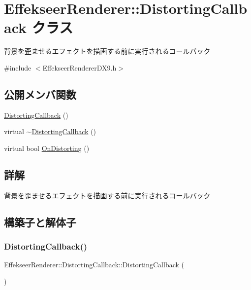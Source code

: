 \hypertarget{class_effekseer_renderer_1_1_distorting_callback}{}\section{Effekseer\+Renderer\+:\+:Distorting\+Callback クラス}
\label{class_effekseer_renderer_1_1_distorting_callback}


背景を歪ませるエフェクトを描画する前に実行されるコールバック  




{\ttfamily \#include $<$Effekseer\+Renderer\+D\+X9.\+h$>$}

\subsection*{公開メンバ関数}
\begin{DoxyCompactItemize}
\item 
\mbox{\hyperlink{class_effekseer_renderer_1_1_distorting_callback_a9f094ba92991cd124fa50b59807f53b4}{Distorting\+Callback}} ()
\item 
virtual \mbox{\hyperlink{class_effekseer_renderer_1_1_distorting_callback_ad773a6992bb498867c0f9304f27c8677}{$\sim$\+Distorting\+Callback}} ()
\item 
virtual bool \mbox{\hyperlink{class_effekseer_renderer_1_1_distorting_callback_a0fd8a141682f73cccdf9e744cd811041}{On\+Distorting}} ()
\end{DoxyCompactItemize}


\subsection{詳解}
背景を歪ませるエフェクトを描画する前に実行されるコールバック 

\subsection{構築子と解体子}
\mbox{\label{class_effekseer_renderer_1_1_distorting_callback_a9f094ba92991cd124fa50b59807f53b4}} 
\subsubsection{\texorpdfstring{Distorting\+Callback()}{DistortingCallback()}}
{\footnotesize\ttfamily Effekseer\+Renderer\+::\+Distorting\+Callback\+::\+Distorting\+Callback (\begin{DoxyParamCaption}{ }\end{DoxyParamCaption})\hspace{0.3cm}{\ttfamily [inline]}}

